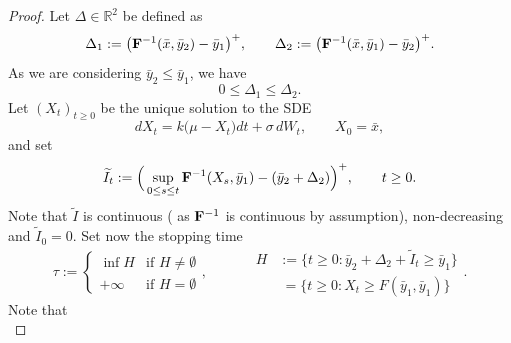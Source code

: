 \documentclass[10pt]{article}
\numberwithin{equation}{section}
\theoremstyle{plain}
\numberwithin{theorem}{section}
\theoremstyle{definition}
\def \R {\mathbb{R}}
\newcommand{\<}{\langle}
\renewcommand{\>}{\rangle}
\renewcommand{\(}{\left(}
\renewcommand{\)}{\right)}
\def \R  {{\mathbb {R}}}
\def \R {{\mathbb {R}}}
\def \tilde {\widetilde}
\begin{document}
{{{\begin{proof}
Let $\Delta \in\R^2$ be defined as
\begin{equation}%
\Delta_1 :=  \big( {\bf F}^{-1}(\bar x,\bar y_2) - \bar y_1 \big)^+ ,\qquad \Delta_2 :=  \big( {\bf F}^{-1}(\bar x,\bar y_1) - \bar y_2 \big)^+.
\end{equation}
As we are considering $\bar y_2 \leq \bar y_1$, we have
\begin{equation}%
0\leq \Delta_1 \leq \Delta_2.
\end{equation}
Let $(X_t)_{t\geq 0}$ be the unique solution to the SDE
\begin{equation}%
dX_t = k  \big(\mu - X_t \big) dt + \sigma\, d W_t, \qquad X_0 = \bar x,
\end{equation} 
and set
\begin{equation}%
\tilde I_t :=
\Big( \sup\limits_{0 \leq s \leq t} {\bf F}^{-1}( X_s , \bar y_1) - (\bar y_2 + \Delta_2 ) \Big)^+ , \qquad t\geq 0 .%
\end{equation} 
Note that $\tilde I$ is continuous (%
as $ {\bf F}^{-1}$ is continuous by assumption), non-decreasing and $\tilde I_0 = 0$. %
Set now the stopping time
\begin{equation}%
 \tau := 
\begin{cases}
\inf  H & \text{if }  H\neq\emptyset\\
+\infty & \text{if }  H= \emptyset
\end{cases}, \qquad\quad \begin{aligned}
 H &:=  \{  t\geq 0: \bar y_2 + \Delta_2 + \tilde I_t \geq \bar y_1  \}\\
 &\ =  \{  t\geq 0:  X_{t} \geq F(\bar y_1 , \bar y_1)  \}
\end{aligned}.
\end{equation}
Note that%
\begin{equation}\label{eq:prop_stop_bar_pen}

\end{equation}
\end{proof}}}}
\end{document}
